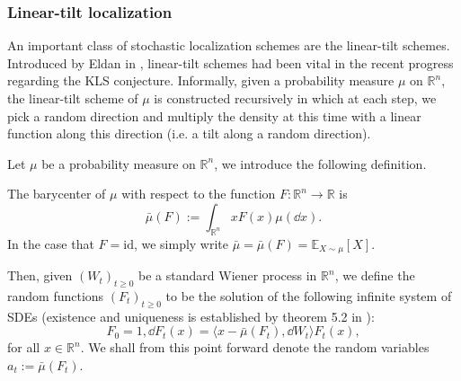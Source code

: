 \subsubsection{Linear-tilt localization}

An important class of stochastic localization schemes are the linear-tilt schemes. Introduced by Eldan 
in \cite{Eldan_2013}, linear-tilt schemes had been vital in the recent progress regarding the KLS 
conjecture. Informally, given a probability measure \(\mu\) on \(\mathbb{R}^n\), the linear-tilt scheme
of \(\mu\) is constructed recursively in which at each step, we pick a random direction and multiply 
the density at this time with a linear function along this direction (i.e. a tilt along a random 
direction). 

Let \(\mu\) be a probability measure on \(\mathbb{R}^n\), we introduce the following definition.
\begin{definition}[Barycenter]
  The barycenter of \(\mu\) with respect to the function \(F : \mathbb{R}^n \to \mathbb{R}\) is
  \[\bar{\mu}(F) := \int_{\mathbb{R}^n} x F(x) \mu(\dd x).\]
  In the case that \(F = \text{id}\), we simply write \(\bar{\mu} = \bar{\mu}(F) = \mathbb{E}_{X \sim \mu}[X]\).
\end{definition}

Then, given \((W_t)_{t \ge 0}\) be a standard Wiener process in \(\mathbb{R}^n\), we define the random functions 
\((F_t)_{t \ge 0}\) to be the solution of the following infinite system of SDEs 
(existence and uniqueness is established by theorem 5.2 in \cite{Øksendal_2003}): 
\begin{equation}\label{eq:stoch_loc}
  F_0 = 1, \dd F_t(x) = \langle x - \bar{\mu}(F_t), \dd W_t \rangle F_t(x),
\end{equation}
for all \(x \in \mathbb{R}^n\). We shall from this point forward denote the random variables 
\(a_t := \bar{\mu}(F_t)\).

